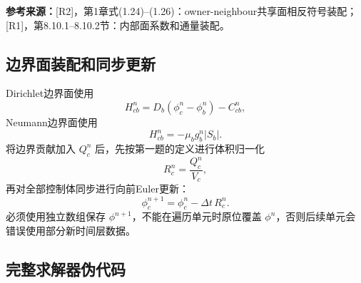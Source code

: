 \documentclass[UTF8,12pt,a4paper]{ctexart}
\numberwithin{equation}{section}
\newcommand{\Rone}{\textnormal{[R1]}}
\newcommand{\Rtwo}{\textnormal{[R2]}}
\newcommand{\source}[1]{%
  \par\smallskip
  \noindent\colorbox{sourcebg}{%
    \parbox{0.955\linewidth}{\raggedright\footnotesize\color{sourcegray}\textbf{参考来源：}#1}%
  }
  \par\smallskip
}
\begin{document}
\source{\Rtwo，第1章式(1.24)--(1.26)：owner-neighbour共享面相反符号装配；\Rone，第8.10.1--8.10.2节：内部面系数和通量装配。}

\subsection{边界面装配和同步更新}

Dirichlet边界面使用
\begin{equation}
  H_{cb}^n=D_b(\phi_c^n-\phi_b^n)
  -C_{cb}^n,
  \label{eq:algorithm_dirichlet}
\end{equation}
Neumann边界面使用
\begin{equation}
  H_{cb}^n=-\mu_bg_b^n|S_b|.
  \label{eq:algorithm_neumann}
\end{equation}
将边界贡献加入 $Q_c^n$ 后，先按第一题的定义进行体积归一化
\begin{equation}
  \boxed{R_c^n=\frac{Q_c^n}{V_c}},
  \label{eq:algorithm_normalize_residual}
\end{equation}
再对全部控制体同步进行向前Euler更新：
\begin{equation}
  \boxed{
  \phi_c^{n+1}
  =\phi_c^n-\Delta t\,R_c^n}.
  \label{eq:algorithm_update}
\end{equation}
必须使用独立数组保存 $\phi^{n+1}$，不能在遍历单元时原位覆盖 $\phi^n$，否则后续单元会错误使用部分新时间层数据。

\subsection{完整求解器伪代码}
\end{document}

